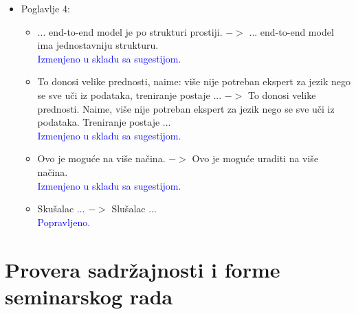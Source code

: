 \documentclass[a4paper]{report}
\newcommand{\odgovor}[1]{\textcolor{blue}{#1}}
\begin{document}
\begin{itemize}
    \item Poglavlje 4:
    \begin{itemize}
        \item ... end-to-end model je po strukturi prostiji. $->$ ... end-to-end model ima jednostavniju strukturu.\\ \odgovor{Izmenjeno u skladu sa sugestijom.}
        \item To donosi velike prednosti, naime: više nije potreban ekspert za jezik nego se sve uči iz podataka, treniranje postaje ... $->$ 
        To donosi velike prednosti. Naime, više nije potreban ekspert za jezik nego se sve uči iz podataka. Treniranje postaje ...\\ \odgovor{Izmenjeno u skladu sa sugestijom.}
        \item Ovo je moguće na više načina. $->$ Ovo je moguće uraditi na više načina.\\ \odgovor{Izmenjeno u skladu sa sugestijom.}
        \item Skušalac ... $->$ Slušalac ...\\ \odgovor{Popravljeno.}
    \end{itemize}
\end{itemize}
  

\section{Provera sadržajnosti i forme seminarskog rada}
\end{document}
